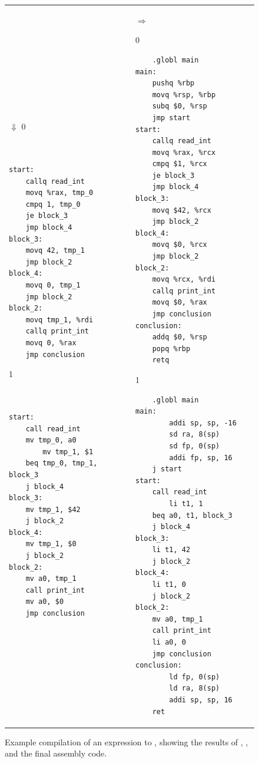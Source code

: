 \documentclass[7x10]{TimesAPriori_MIT}%
\def\xeightysixEd{0}
\def\riscvEd{1}
\def\architecture{1}
\numberwithin{theorem}{chapter}
\numberwithin{definition}{chapter}
\numberwithin{equation}{chapter}
\begin{document}
\begin{figure}[tbp]
\begin{tcolorbox}[colback=white]
{\begin{tabular}{lll}
\begin{minipage}{0.4\textwidth}
\begin{lstlisting}
\end{lstlisting}
$\Downarrow$
\if\architecture\xeightysixEd
\begin{lstlisting}


start:
	callq read_int
	movq %rax, tmp_0
	cmpq 1, tmp_0
	je block_3
	jmp block_4
block_3:
	movq 42, tmp_1
	jmp block_2
block_4:
	movq 0, tmp_1
	jmp block_2
block_2:
	movq tmp_1, %rdi
	callq print_int
	movq 0, %rax
	jmp conclusion        
\end{lstlisting}
\fi
\if\architecture\riscvEd
\begin{lstlisting}


start:
	call read_int
	mv tmp_0, a0
        mv tmp_1, $1
	beq tmp_0, tmp_1, block_3
	j block_4
block_3:
	mv tmp_1, $42
	j block_2
block_4:
	mv tmp_1, $0
	j block_2
block_2:
	mv a0, tmp_1
	call print_int
	mv a0, $0
	jmp conclusion        
\end{lstlisting}
\fi
\end{minipage}
&
$\Rightarrow\qquad$
\begin{minipage}{0.4\textwidth}
\if\architecture\xeightysixEd
\begin{lstlisting}
	.globl main
main:
	pushq %rbp
	movq %rsp, %rbp
	subq $0, %rsp
	jmp start
start:
	callq read_int
	movq %rax, %rcx
	cmpq $1, %rcx
	je block_3
	jmp block_4
block_3:
	movq $42, %rcx
	jmp block_2
block_4:
	movq $0, %rcx
	jmp block_2
block_2:
	movq %rcx, %rdi
	callq print_int
	movq $0, %rax
	jmp conclusion
conclusion:
	addq $0, %rsp
	popq %rbp
	retq
\end{lstlisting}
\fi
\if\architecture\riscvEd
\begin{lstlisting}
	.globl main
main:
        addi sp, sp, -16
        sd ra, 8(sp)
        sd fp, 0(sp)
        addi fp, sp, 16
	j start
start:
	call read_int
        li t1, 1
	beq a0, t1, block_3
	j block_4
block_3:
	li t1, 42
	j block_2
block_4:
	li t1, 0
	j block_2
block_2:
	mv a0, tmp_1
	call print_int
	li a0, 0
	jmp conclusion        
conclusion:
        ld fp, 0(sp)
        ld ra, 8(sp)
        addi sp, sp, 16
	ret
\end{lstlisting}
\fi
\end{minipage}
\end{tabular}
\fi}
\end{tcolorbox}

  \caption{Example compilation of an  expression to \ArchName, showing
  the results of ,
  , and the final \ArchName{} assembly code.  }
\label{fig:if-example-x86}
\end{figure}
\end{document}
